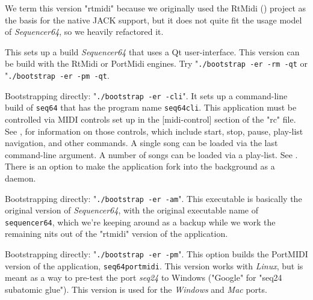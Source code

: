         We term this version "rtmidi" because we originally
        used the RtMidi (\cite{rtmidi}) project as the basis for the native
        JACK support, but it does not quite fit the usage model
        of \textsl{Sequencer64}, so we heavily refactored it.

        This sets up a build \textsl{Sequencer64} that uses a Qt
        user-interface.  This version can be build with the RtMidi or PortMidi
        engines.
        Try "\texttt{./bootstrap -er -rm -qt} or
        "\texttt{./bootstrap -er -pm -qt}.

        Bootstrapping directly:
        "\texttt{./bootstrap -er -cli}".
        It sets up a command-line build of \texttt{seq64} that has the
        program name \texttt{seq64cli}.
        This application must be controlled via MIDI controls set up in the
        [midi-control] section of the "rc" file.
        See , for
        information on those controls, which include start, stop,
        pause, play-list navigation, and other commands.
        A single song can be loaded via the last command-line argument.
        A number of songs can be loaded via a play-list.
        See .
        There is an option to make
        the application fork into the background as a daemon.

        Bootstrapping directly:
        "\texttt{./bootstrap -er -am}".
        This executable is basically the original version of 
        \textsl{Sequencer64}, with the original executable name of
        \texttt{sequencer64}, which we're keeping around as a backup while we
        work the remaining nits out of the "rtmidi" version of the application.

        Bootstrapping directly:
        "\texttt{./bootstrap -er -pm}".
        This option builds the PortMIDI version of the application,
        \texttt{seq64portmidi}.  This version works with
        \textsl{Linux}, but is meant as a way to pre-test the
        port \textsl{seq24} to Windows ("Google" for "seq24 subatomic glue").
        This version is used for the \textsl{Windows} and
        \textsl{Mac} ports.

